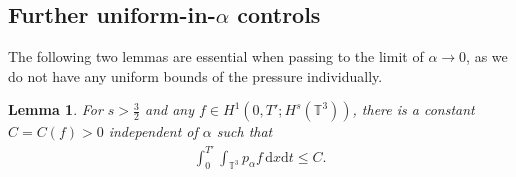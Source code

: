 \documentclass[reqno,a4paper,11pt]{amsart}
\theoremstyle{plain}
\newtheorem{lemma}[theorem]{Lemma}
\numberwithin{equation}{section}
\renewcommand{\d}{\mathrm{d}}
\newcommand{\dx}{\d x}
\newcommand{\dt}{\d t}
\begin{document}
							\subsection{Further uniform-in-\texorpdfstring{$\alpha$}{α} controls}
							The following two lemmas are essential when passing to the limit of $ \alpha \to 0 $, as we do not have any uniform bounds of the pressure individually.
							\begin{lemma}\label{lem:limit 1}
								For $s>\frac{3}{2}$ and any  $f\in H^{1}(0,T';H^{s}(\mathbb{T}^{3}))$, there is a constant $C=C(f) > 0$  independent of  $\alpha$ such that
								\begin{align}
									\int_0^{T'}\int_{\mathbb{T}^{3}}p_{\alpha}f\,\dx\dt\leq C.\label{new pp est}
								\end{align}
							\end{lemma}
\end{document}
